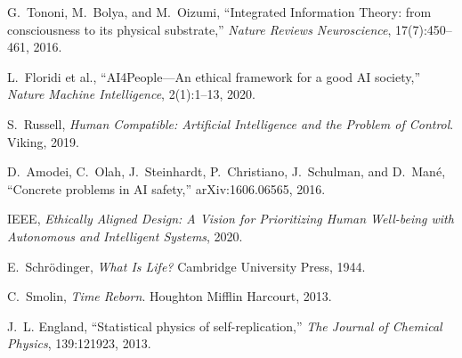 \documentclass[11pt,a4paper]{article}
\begin{document}
\begin{thebibliography}{99}
G.~Tononi, M.~Bolya, and M.~Oizumi, ``Integrated Information Theory: from consciousness to its physical substrate,'' \emph{Nature Reviews Neuroscience}, 17(7):450--461, 2016.

L.~Floridi et al., ``AI4People---An ethical framework for a good AI society,'' \emph{Nature Machine Intelligence}, 2(1):1--13, 2020.

S.~Russell, \emph{Human Compatible: Artificial Intelligence and the Problem of Control}. Viking, 2019.

D.~Amodei, C.~Olah, J.~Steinhardt, P.~Christiano, J.~Schulman, and D.~Man{\'e}, ``Concrete problems in AI safety,'' arXiv:1606.06565, 2016.

IEEE, \emph{Ethically Aligned Design: A Vision for Prioritizing Human Well-being with Autonomous and Intelligent Systems}, 2020.

E.~Schr{\"o}dinger, \emph{What Is Life?} Cambridge University Press, 1944.

C.~Smolin, \emph{Time Reborn}. Houghton Mifflin Harcourt, 2013.

J.~L. England, ``Statistical physics of self-replication,'' \emph{The Journal of Chemical Physics}, 139:121923, 2013.

\end{thebibliography}
\end{document}
